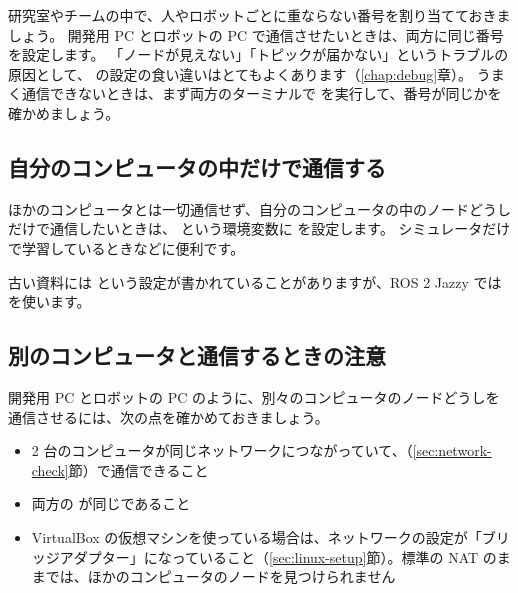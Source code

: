 \begin{point}
  研究室やチームの中で、人やロボットごとに重ならない番号を割り当てておきましょう。
  開発用 PC とロボットの PC で通信させたいときは、両方に同じ番号を設定します。
  「ノードが見えない」「トピックが届かない」というトラブルの原因として、 の設定の食い違いはとてもよくあります（\ref{chap:debug}章）。
  うまく通信できないときは、まず両方のターミナルで  を実行して、番号が同じかを確かめましょう。
\end{point}

\subsection{自分のコンピュータの中だけで通信する}

ほかのコンピュータとは一切通信せず、自分のコンピュータの中のノードどうしだけで通信したいときは、 という環境変数に  を設定します。
シミュレータだけで学習しているときなどに便利です。


古い資料には  という設定が書かれていることがありますが、ROS 2 Jazzy では  を使います。

\subsection{別のコンピュータと通信するときの注意}

開発用 PC とロボットの PC のように、別々のコンピュータのノードどうしを通信させるには、次の点を確かめておきましょう。

\begin{itemize}
  \item 2 台のコンピュータが同じネットワークにつながっていて、（\ref{sec:network-check}節）で通信できること
  \item 両方の  が同じであること
  \item VirtualBox の仮想マシンを使っている場合は、ネットワークの設定が「ブリッジアダプター」になっていること（\ref{sec:linux-setup}節）。標準の NAT のままでは、ほかのコンピュータのノードを見つけられません
\end{itemize}

